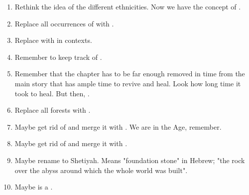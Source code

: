 \begin{enumerate}
  \item 
    Rethink the idea of the different \scatha ethnicities.
    Now we have the concept of . 
    
  \item 
    Replace all occurrences of  with \quo{\rethyax}. 
  
  \item 
    Replace \quo{\bane} with  in \resphan contexts. 
  
  \item 
    Remember to keep track of . 
  
  \item 
    Remember that the chapter  has to be far enough removed in time from the main story that \Teshrial has ample time to revive and heal.
    Look how long time it took \Urizeth to heal. 
    But then, . 
  
  \item
    Replace all forests with . 
  
  \item 
    Maybe get rid of \GreatVelcad and merge it with \Tepharae. 
    We are in the \Scatha Age, remember.
    
  \item 
    Maybe get rid of \ClanTelcra and merge it with \ClanZether. 
    
  \item 
    Maybe rename \Miith to Shetiyah.
    Means "foundation stone" in Hebrew; "the rock over the abyss around which the whole world was built". 
    
  \item 
    Maybe \LocarPsyrex is a \quiljaar.


\end{enumerate}





